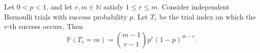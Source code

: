 \begin{theorem}
Let $0<p<1$, and let $r,m\in\mathbb{N}$ satisfy $1\le r\le m$. Consider
independent Bernoulli trials with success probability $p$. Let $T_r$ be the
trial index on which the $r$-th success occurs. Then
\[
\mathbb P(T_r=m)
=
\binom{m-1}{r-1}p^r(1-p)^{m-r}.
\]
\end{theorem}

